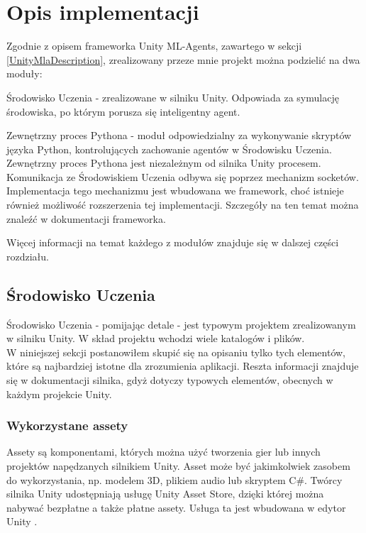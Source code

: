 \chapter{Opis implementacji}
\label{ImplementationOverview}
Zgodnie z opisem frameworka Unity ML-Agents, zawartego w sekcji \ref{UnityMlaDescription}, zrealizowany przeze mnie projekt można podzielić na dwa moduły:

\begin{enumerate*}
\item Środowisko Uczenia - zrealizowane w silniku Unity. Odpowiada za symulację środowiska, po którym porusza się inteligentny agent.
\item Zewnętrzny proces Pythona - moduł odpowiedzialny za wykonywanie skryptów języka Python, kontrolujących zachowanie agentów w Środowisku Uczenia. \\
Zewnętrzny proces Pythona jest niezależnym od silnika Unity procesem. Komunikacja ze Środowiskiem Uczenia odbywa się poprzez mechanizm socketów. Implementacja tego mechanizmu jest wbudowana we framework, choć istnieje również możliwość rozszerzenia tej implementacji. Szczegóły na ten temat można znaleźć w dokumentacji frameworka.
\end{enumerate*}

Więcej informacji na temat każdego z modułów znajduje się w dalszej części rozdziału.

\section{Środowisko Uczenia}
Środowisko Uczenia - pomijając detale - jest typowym projektem zrealizowanym w silniku Unity. W skład projektu wchodzi wiele katalogów i plików. \\
W niniejszej sekcji postanowiłem skupić się na opisaniu tylko tych elementów, które są najbardziej istotne dla zrozumienia aplikacji. Reszta informacji znajduje się w dokumentacji silnika, gdyż dotyczy typowych elementów, obecnych w każdym projekcie Unity.

\subsection{Wykorzystane assety}
Assety są komponentami, których można użyć tworzenia gier lub innych projektów napędzanych silnikiem Unity. Asset może być jakimkolwiek zasobem do wykorzystania, np. modelem 3D, plikiem audio lub skryptem C\#. Twórcy silnika Unity udostępniają usługę Unity Asset Store, dzięki której można nabywać bezpłatne a także płatne assety. Usługa ta jest wbudowana w edytor Unity \cite{unity:assetStore}.

